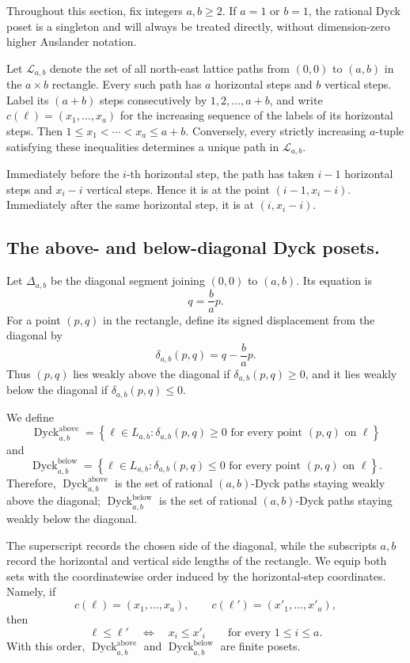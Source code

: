 \documentclass[12pt,a4paper,english,reqno]{amsart}
\theoremstyle{plain}
\theoremstyle{definition}
\newcommand{\Dyck}{\operatorname{Dyck}}
\begin{document}
Throughout this section, fix integers $a,b\geq2$. If $a=1$ or $b=1$,
the rational Dyck poset is a singleton and will always be treated
directly, without dimension-zero higher Auslander notation.

Let $\mathcal L_{a,b}$ denote the set of all north-east lattice paths from
$(0,0)$ to $(a,b)$ in the $a\times b$ rectangle. Every such path has
$a$ horizontal steps and $b$ vertical steps. Label its $(a+b)$ steps
consecutively by $1,2,\ldots,a+b$,
and write $c(\ell)=(x_1,\ldots,x_a)$
for the increasing sequence of the labels of its horizontal steps.
Then $1\leq x_1<\cdots<x_a\leq a+b$.
Conversely, every strictly increasing $a$-tuple satisfying these
inequalities determines a unique path in $\mathcal L_{a,b}$.

Immediately before the $i$-th horizontal step, the path has taken
$i-1$ horizontal steps and $x_i-i$ vertical steps. Hence it is at the
point $(i-1,x_i-i)$.
Immediately after the same horizontal step, it is at $(i,x_i-i)$.


\subsection{The above- and below-diagonal Dyck posets.}
\label{sub: the above and blow-dia-Dyck-p}

Let $\Delta_{a,b}$ be the diagonal segment joining $(0,0)$ to $(a,b)$.
Its equation is
\[
q=\frac ba p.
\]
For a point $(p,q)$ in the rectangle, define its signed displacement
from the diagonal by
\[
\delta_{a,b}(p,q)
=
q-\frac ba p.
\]
Thus $(p,q)$ lies weakly above the diagonal if
$\delta_{a,b}(p,q)\geq0$, and it lies weakly below the diagonal if
$\delta_{a,b}(p,q)\leq0$.

We define
\[
\Dyck^{\mathrm{above}}_{a,b}
=
\left\{
\ell\in L_{a,b}:
\delta_{a,b}(p,q)\geq0
\text{ for every point }(p,q)\text{ on }\ell
\right\}
\]
and
\[
\Dyck^{\mathrm{below}}_{a,b}
=
\left\{
\ell\in L_{a,b}:
\delta_{a,b}(p,q)\leq0
\text{ for every point }(p,q)\text{ on }\ell
\right\}.
\]
Therefore, $\Dyck^{\mathrm{above}}_{a,b}$ is the set of rational
$(a,b)$-Dyck paths staying weakly above the diagonal; $\Dyck^{\mathrm{below}}_{a,b}$ is the set of rational
$(a,b)$-Dyck paths staying weakly below the diagonal.


The superscript records the chosen side of the diagonal, while the
subscripts $a,b$ record the horizontal and vertical side lengths of
the rectangle.
We equip both sets with the coordinatewise order induced by the
horizontal-step coordinates. Namely, if
\[
c(\ell)=(x_1,\ldots,x_a),
\qquad
c(\ell')=(x'_1,\ldots,x'_a),
\]
then
\[
\ell\leq\ell'
\quad\Longleftrightarrow\quad
x_i\leq x'_i
\qquad
\text{for every }1\leq i\leq a.
\]
With this order,
$\Dyck^{\mathrm{above}}_{a,b}$ and
$\Dyck^{\mathrm{below}}_{a,b}$ are finite posets.
\end{document}
